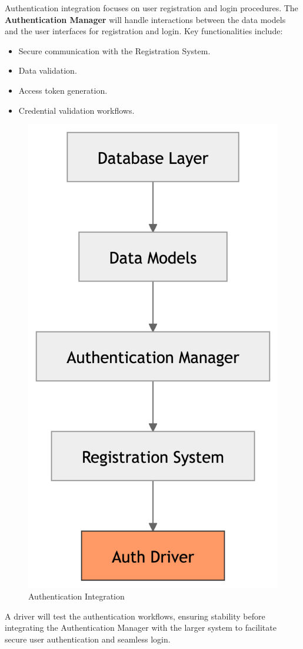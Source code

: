 Authentication integration focuses on user registration and login procedures. The \textbf{Authentication Manager} will handle interactions between the data models and the user interfaces for registration and login. Key functionalities include:
\begin{itemize}
    \item Secure communication with the Registration System.
    \item Data validation.
    \item Access token generation.
    \item Credential validation workflows.
\end{itemize}
\begin{figure}[H]
    \begin{center} \includegraphics[width=0.18\linewidth]{JhaBhatiaSharma/imagesDD/AuthenticationIntegration.png}
    \caption{Authentication Integration}
        \label{fig:authenticationIntegration}
    \end{center}
\end{figure}

A driver will test the authentication workflows, ensuring stability before integrating the Authentication Manager with the larger system to facilitate secure user authentication and seamless login.

